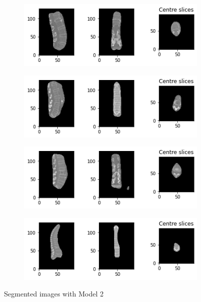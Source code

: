\begin{figure}[ht!]
\centering
\begin{subfigure}[b]{0.7\textwidth}
   \includegraphics[width=1\linewidth]{images/results_4/1.png}
   \label{fig:Ng1} 
\end{subfigure}

\begin{subfigure}[b]{0.7\textwidth}
   \includegraphics[width=1\linewidth]{images/results_4/2.png}
   \label{fig:Ng2}
\end{subfigure}

\begin{subfigure}[b]{0.7\textwidth}
   \includegraphics[width=1\linewidth]{images/results_4/3.png}
   \label{fig:Ng3}
\end{subfigure}

\begin{subfigure}[b]{0.7\textwidth}
   \includegraphics[width=1\linewidth]{images/results_4/4.png}
   \label{fig:Ng4}
\end{subfigure}


\caption[Results of spine segmentation with Model 2]{Segmented images with Model 2}
\label{fig:spine-segmentations-2}
\end{figure}